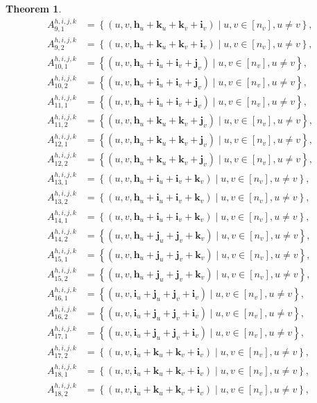 \documentclass[11pt]{article}
\newtheorem{theorem}[lemma]{Theorem}
\theoremstyle{plain}
\theoremstyle{plain}
\theoremstyle{definition}
\numberwithin{theo}{section}
\newcommand{\bh}{{\mathbf h}}
\newcommand{\bi}{{\mathbf i}}
\newcommand{\bj}{{\mathbf j}}
\newcommand{\bk}{{\mathbf k}}
\begin{document}
\begin{theorem}
\begin{align*}
A_{9,1}^{h,i,j,k} &= \left\{(u,v,\bh_u+\bk_u+\bk_v+\bi_v)\mid u,v\in[n_v], u\neq v\right\}, \\
A_{9,2}^{h,i,j,k} &= \left\{(u,v,\bh_u+\bk_u+\bk_v+\bi_v)\mid u,v\in[n_v], u\neq v\right\}, \\
A_{10,1}^{h,i,j,k} &= \left\{(u,v,\bh_u+\bi_u+\bi_v+\bj_v)\mid u,v\in[n_v], u\neq v\right\}, \\
A_{10,2}^{h,i,j,k} &= \left\{(u,v,\bh_u+\bi_u+\bi_v+\bj_v)\mid u,v\in[n_v], u\neq v\right\}, \\
A_{11,1}^{h,i,j,k} &= \left\{(u,v,\bh_u+\bi_u+\bi_v+\bj_v)\mid u,v\in[n_v], u\neq v\right\}, \\
A_{11,2}^{h,i,j,k} &= \left\{(u,v,\bh_u+\bk_u+\bk_v+\bj_v)\mid u,v\in[n_v], u\neq v\right\}, \\
A_{12,1}^{h,i,j,k} &= \left\{(u,v,\bh_u+\bk_u+\bk_v+\bj_v)\mid u,v\in[n_v], u\neq v\right\}, \\
A_{12,2}^{h,i,j,k} &= \left\{(u,v,\bh_u+\bk_u+\bk_v+\bj_v)\mid u,v\in[n_v], u\neq v\right\}, \\
A_{13,1}^{h,i,j,k} &= \left\{(u,v,\bh_u+\bi_u+\bi_v+\bk_v)\mid u,v\in[n_v], u\neq v\right\}, \\
A_{13,2}^{h,i,j,k} &= \left\{(u,v,\bh_u+\bi_u+\bi_v+\bk_v)\mid u,v\in[n_v], u\neq v\right\}, \\
A_{14,1}^{h,i,j,k} &= \left\{(u,v,\bh_u+\bi_u+\bi_v+\bk_v)\mid u,v\in[n_v], u\neq v\right\}, \\
A_{14,2}^{h,i,j,k} &= \left\{(u,v,\bh_u+\bj_u+\bj_v+\bk_v)\mid u,v\in[n_v], u\neq v\right\}, \\
A_{15,1}^{h,i,j,k} &= \left\{(u,v,\bh_u+\bj_u+\bj_v+\bk_v)\mid u,v\in[n_v], u\neq v\right\}, \\
A_{15,2}^{h,i,j,k} &= \left\{(u,v,\bh_u+\bj_u+\bj_v+\bk_v)\mid u,v\in[n_v], u\neq v\right\}, \\
A_{16,1}^{h,i,j,k} &= \left\{(u,v,\bi_u+\bj_u+\bj_v+\bi_v)\mid u,v\in[n_v], u\neq v\right\}, \\
A_{16,2}^{h,i,j,k} &= \left\{(u,v,\bi_u+\bj_u+\bj_v+\bi_v)\mid u,v\in[n_v], u\neq v\right\}, \\
A_{17,1}^{h,i,j,k} &= \left\{(u,v,\bi_u+\bj_u+\bj_v+\bi_v)\mid u,v\in[n_v], u\neq v\right\}, \\
A_{17,2}^{h,i,j,k} &= \left\{(u,v,\bi_u+\bk_u+\bk_v+\bi_v)\mid u,v\in[n_v], u\neq v\right\}, \\
A_{18,1}^{h,i,j,k} &= \left\{(u,v,\bi_u+\bk_u+\bk_v+\bi_v)\mid u,v\in[n_v], u\neq v\right\}, \\
A_{18,2}^{h,i,j,k} &= \left\{(u,v,\bi_u+\bk_u+\bk_v+\bi_v)\mid u,v\in[n_v], u\neq v\right\}, \\

\end{align*}
\end{theorem}
\end{document}
